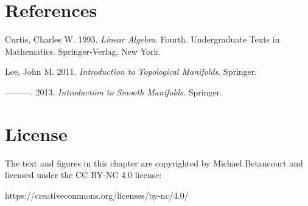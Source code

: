 \documentclass[
  letterpaper,
  DIV=11,
  numbers=noendperiod]{scrartcl}
\newlength{\cslhangindent}
\newenvironment{CSLReferences}[2] %
 {\begin{list}{}{%
  \setlength{\itemindent}{0pt}
  \setlength{\leftmargin}{0pt}
  \setlength{\parsep}{0pt}
  \ifodd #1
   \setlength{\leftmargin}{\cslhangindent}
   \setlength{\itemindent}{-1\cslhangindent}
  \fi
  \setlength{\itemsep}{#2\baselineskip}}}
 {\end{list}}
\begin{document}
\section*{References}\label{references}

\label{refs}
\begin{CSLReferences}{1}{0}
Curtis, Charles W. 1993. \emph{Linear Algebra}. Fourth. Undergraduate
Texts in Mathematics. Springer-Verlag, New York.

Lee, John M. 2011. \emph{Introduction to Topological Manifolds}.
Springer.

---------. 2013. \emph{Introduction to Smooth Manifolds}. Springer.

\end{CSLReferences}

\section*{License}\label{license}

The text and figures in this chapter are copyrighted by Michael
Betancourt and licensed under the CC BY-NC 4.0 license:

https://creativecommons.org/licenses/by-nc/4.0/
\end{document}
